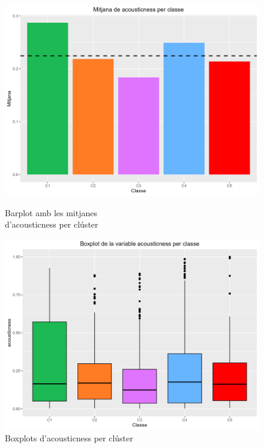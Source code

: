\begin{figure}[H]
\centering
    \begin{minipage}{.49\textwidth}
        \centering
        \includegraphics[width=0.95\linewidth]{Images/5_Profiling/numeriques/Num_BarPlot_acousticness.png}
        \caption{Barplot amb les mitjanes \\ d'acousticness per clúster}
        \label{fig:Num_BarPlot_acousticness}
    \end{minipage}%
    \begin{minipage}{.49\textwidth}
        \centering
        \includegraphics[width=0.95\linewidth]{Images/5_Profiling/numeriques/Num_BoxPlot_acousticness.png}
        \caption{Boxplots d'acousticness per clúster}
        \label{fig:Num_BoxPlot_acousticness}
    \end{minipage}%
\end{figure}


